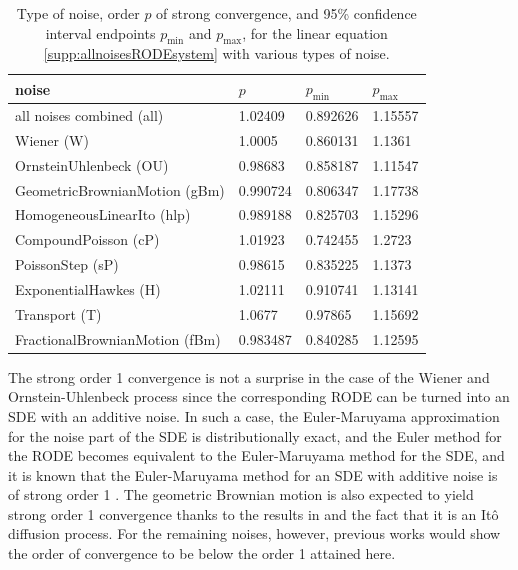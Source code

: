 \documentclass[reqno,12pt]{amsart}
\theoremstyle{plain} %
\theoremstyle{definition} %
\begin{document}
\begin{table}
    \begin{center}
        \begin{tabular}[htb]{|l|l|l|l|}
            \hline noise & $p$ & $p_{\textrm{min}}$ & $p_{\textrm{max}}$ \\
            \hline \hline
            all noises combined (all) & 1.02409 & 0.892626 & 1.15557 \\
            Wiener (W) & 1.0005 & 0.860131 & 1.1361 \\
            OrnsteinUhlenbeck (OU) & 0.98683 & 0.858187 & 1.11547 \\
            GeometricBrownianMotion (gBm) & 0.990724 & 0.806347 & 1.17738 \\
            HomogeneousLinearIto (hlp) & 0.989188 & 0.825703 & 1.15296 \\
            CompoundPoisson (cP) & 1.01923 & 0.742455 & 1.2723 \\
            PoissonStep (sP) & 0.98615 & 0.835225 & 1.1373 \\
            ExponentialHawkes (H) & 1.02111 & 0.910741 & 1.13141 \\
            Transport (T) & 1.0677 & 0.97865 & 1.15692 \\
            FractionalBrownianMotion (fBm) & 0.983487 & 0.840285 & 1.12595 \\
            \hline
        \end{tabular}
    \end{center}

    \bigskip

    \caption{Type of noise, order $p$ of strong convergence, and 95\% confidence interval endpoints $p_{\textrm{min}}$ and $p_{\textrm{max}}$, for the linear equation \cref{supp:allnoisesRODEsystem} with various types of noise.}

    \label{supp:tabeachnoise}
\end{table}

The strong order 1 convergence is not a surprise in the case of the Wiener and Ornstein-Uhlenbeck process since the corresponding RODE can be turned into an SDE with an additive noise. In such a case, the Euler-Maruyama approximation for the noise part of the SDE is distributionally exact, and the Euler method for the RODE becomes equivalent to the Euler-Maruyama method for the SDE, and it is known that the Euler-Maruyama method for an SDE with additive noise is of strong order 1 \cite{HighamKloeden2021}. The geometric Brownian motion is also expected to yield strong order 1 convergence thanks to the results in \cite{WangCaoHanKloeden2021} and the fact that it is an It\^o diffusion process. For the remaining noises, however, previous works would show the order of convergence to be below the order 1 attained here.
\end{document}
